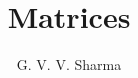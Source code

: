 \documentclass[journal,12pt,twocolumn]{IEEEtran}
\begin{document}
\makeatletter
{}
\makeatother

\let\StandardTheFigure\thefigure
\let\vec\mathbf
\let\j\jmath
\renewcommand{\thefigure}{\theproblem}



\def\putbox#1#2#3{\makebox[0in][l]{\makebox[#1][l]{}\raisebox{\baselineskip}[0in][0in]{\raisebox{#2}[0in][0in]{#3}}}}
     \def\rightbox#1{\makebox[0in][r]{#1}}
     \def\centbox#1{\makebox[0in]{#1}}
     \def\topbox#1{\raisebox{-\baselineskip}[0in][0in]{#1}}
     \def\midbox#1{\raisebox{-0.5\baselineskip}[0in][0in]{#1}}

\vspace{3cm}

\title{
	Matrices
}


%
%
%

\author{
	G. V. V. Sharma
}
% 
%
\end{document}
